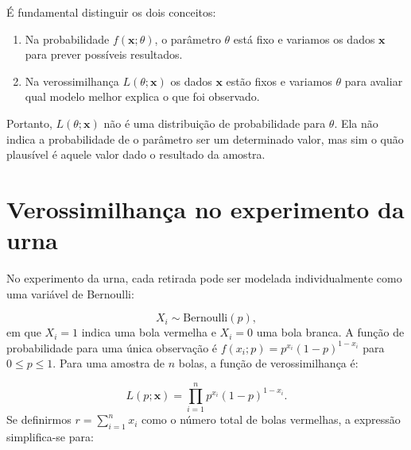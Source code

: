 \documentclass[
  letterpaper,
  DIV=11,
  numbers=noendperiod]{scrreprt}
\begin{document}
\begin{tcolorbox}[enhanced jigsaw, colback=white, leftrule=.75mm, colbacktitle=quarto-callout-warning-color!10!white, breakable, titlerule=0mm, bottomtitle=1mm, title=\textcolor{quarto-callout-warning-color}{\faExclamationTriangle}\hspace{0.5em}{Probabilidade e verossimilhança}, colframe=quarto-callout-warning-color-frame, toprule=.15mm, opacityback=0, bottomrule=.15mm, opacitybacktitle=0.6, arc=.35mm, toptitle=1mm, rightrule=.15mm, coltitle=black, left=2mm]

É fundamental distinguir os dois conceitos:

\begin{enumerate}
\def\labelenumi{\arabic{enumi}.}
\item
  Na probabilidade \(f(\mathbf{x}; \theta)\), o parâmetro \(\theta\)
  está fixo e variamos os dados \(\mathbf{x}\) para prever possíveis
  resultados.
\item
  Na verossimilhança \(L(\theta; \mathbf{x})\) os dados \(\mathbf{x}\)
  estão fixos e variamos \(\theta\) para avaliar qual modelo melhor
  explica o que foi observado.
\end{enumerate}

Portanto, \(L(\theta; \mathbf{x})\) não é uma distribuição de
probabilidade para \(\theta\). Ela não indica a probabilidade de o
parâmetro ser um determinado valor, mas sim o quão plausível é aquele
valor dado o resultado da amostra.

\end{tcolorbox}

\section{Verossimilhança no experimento da
urna}\label{verossimilhanuxe7a-no-experimento-da-urna}

No experimento da urna, cada retirada pode ser modelada individualmente
como uma variável de Bernoulli:

\[X_i \sim \text{Bernoulli}(p),\] em que \(X_i = 1\) indica uma bola
vermelha e \(X_i = 0\) uma bola branca. A função de probabilidade para
uma única observação é \(f(x_i;p) = p^{x_i}(1-p)^{1-x_i}\) para
\(0 \leq p \leq 1\). Para uma amostra de \(n\) bolas, a função de
verossimilhança é:

\[L(p; \mathbf{x}) = \prod\limits_{i=1}^{n}p^{x_i}(1-p)^{1-x_i}.\] Se
definirmos \(r = \sum\limits_{i=1}^{n} x_i\) como o número total de
bolas vermelhas, a expressão simplifica-se para:
\end{document}
